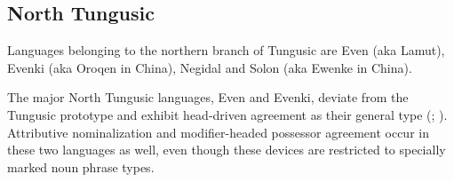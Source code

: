 \subsection{North Tungusic}
Languages belonging to the northern branch of Tungusic are Even (aka Lamut), Evenki (aka Oroqen in China), Negidal and Solon (aka Ewenke in China).

The major North Tungusic languages, Even and Evenki, deviate from the Tungusic prototype and exhibit head\hyp{}driven agreement as their general type (\citealt[11]{malchukov1995}; \citealt[18]{bulatova-etal1999}). Attributive nominalization and modifier\hyp{}headed possessor agreement occur in these two languages as well, even though these devices are restricted to specially marked noun phrase types.


